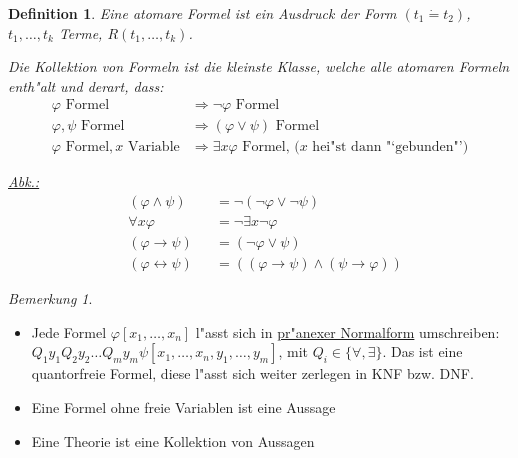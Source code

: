 \documentclass[a4paper,12pt,numbers=noenddot,parskip=full]{scrartcl}
\theoremstyle{dotless}
\newtheorem{definition}[theorem]{Definition}
\theoremstyle{remark}
\newtheorem*{remark}{Bemerkung}
\begin{document}
\begin{definition}
	Eine atomare Formel ist ein Ausdruck der Form $(t_1 \dot= t_2)$, $t_1, \dots, t_k$ Terme, $R(t_1, \dots, t_k)$.
	
	Die Kollektion von Formeln ist die kleinste Klasse, welche alle atomaren Formeln enth"alt und derart, dass:
	\begin{align*}
		\varphi \text{ Formel} &\Longrightarrow \lnot \varphi \text{ Formel}\\
		\varphi, \psi \text{ Formel} &\Longrightarrow (\varphi \lor \psi) \text{ Formel}\\
		\varphi \text{ Formel}, x \text{ Variable} &\Longrightarrow \exists x \varphi \text{ Formel, ($x$ hei"st dann "`gebunden"')}
	\end{align*}
	
	\underline{Abk.:} \begin{align*}
		&(\varphi \land \psi) &&= \lnot(\lnot\varphi\lor\lnot\psi)\\
		&\forall x \varphi &&= \lnot \exists x \lnot \varphi\\
		&(\varphi \rightarrow \psi) &&= (\lnot \varphi \lor \psi)\\
		&(\varphi \leftrightarrow \psi) &&= ((\varphi \rightarrow \psi) \land (\psi \rightarrow \varphi))
	\end{align*}
\end{definition}

\begin{remark}
	
	\begin{itemize}
		\item Jede Formel $\varphi [x_1, \dots, x_n]$ l"asst sich in \underline{pr"anexer Normalform} umschreiben:	
		$Q_1 y_1 Q_2 y_2 \dots Q_m y_m \psi [x_1, \dots, x_n, y_1, \dots, y_m]$, mit $Q_i \in \{\forall, \exists\}$. Das ist eine quantorfreie Formel, diese l"asst sich weiter zerlegen in KNF bzw. DNF.
		\item Eine Formel ohne freie Variablen ist eine Aussage
		\item Eine Theorie ist eine Kollektion von Aussagen
	\end{itemize}
\end{remark}
\end{document}
